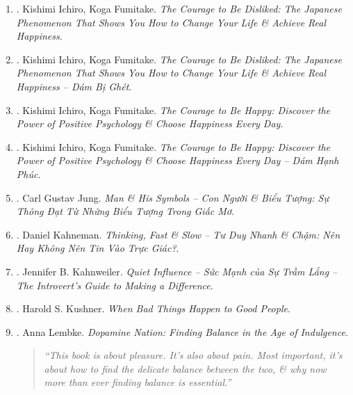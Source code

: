 \documentclass{article}
\begin{document}
\begin{enumerate}
	[Endorsement] ``Dr. {\sc Faith Harper} has done it again. Using the foulest of language, Faith has written a book that explains anger, gives you tools to turn down the volume on anger \& presents it in a way where you can actually read the whole fucking book (because it isn't boring, constipated\footnote{unable to get rid of waste material from the bowels easily, bị táo bón.} \& dry like most academic tomes). If you think you might be irritable, or if your wife says you are irritable, do yourself a big ass favor, buy this book, read it, put the tools in it into practice. You can thank me later -- when you are happier, more connected \& less fucking irritable!'' -- Dr. {\sc John Schinnerer}, creator of the Ultimate Anger Management Course, host of {\it The Evolved Caveman Podcast}, \& High Performance Coach at Guide to Self
	\item \cite{Ichiro_Fumitake_disliked}. {\sc Kishimi Ichiro, Koga Fumitake}. {\it The Courage to Be Disliked: The Japanese Phenomenon That Shows You How to Change Your Life \& Achieve Real Happiness}.
	\item \cite{Ichiro_Fumitake_disliked_VN}. {\sc Kishimi Ichiro, Koga Fumitake}. {\it The Courage to Be Disliked: The Japanese Phenomenon That Shows You How to Change Your Life \& Achieve Real Happiness -- Dám Bị Ghét}.\hfill{\sf[done]}
	\item \cite{Ichiro_Fumitake_happy}. {\sc Kishimi Ichiro, Koga Fumitake}. {\it The Courage to Be Happy: Discover the Power of Positive Psychology \& Choose Happiness Every Day}.
	\item \cite{Ichiro_Fumitake_happy_VN}. Kishimi Ichiro, Koga Fumitake. {\it The Courage to Be Happy: Discover the Power of Positive Psychology \& Choose Happiness Every Day -- Dám Hạnh Phúc}.\hfill{\sf[done]}
	\item \cite{Jung2022}. Carl Gustav Jung. {\it Man \& His Symbols -- Con Người \& Biểu Tượng: Sự Thông Đạt Từ Những Biểu Tượng Trong Giấc Mơ}.\hfill{\sf[done]}
	\item \cite{Kahneman2022}. Daniel Kahneman. {\it Thinking, Fast \& Slow -- Tư Duy Nhanh \& Chậm: Nên Hay Không Nên Tin Vào Trực Giác?}.\\\mbox{}\hfill{\sf[done]}
	\item \cite{Kahnweiler2022}. Jennifer B. Kahnweiler. {\it Quiet Influence -- Sức Mạnh của Sự Trầm Lắng -- The Introvert's Guide to Making a Difference}.\hfill{\sf[done]}
	\item \cite{Kushner_bad_things_good_people}. {\sc Harold S. Kushner}. {\it When Bad Things Happen to Good People}.
	\item \cite{Lembke_dopamine}. {\sc Anna Lembke}. {\it Dopamine Nation: Finding Balance in the Age of Indulgence}.\hfill{\sf[reading]}
	\begin{quotation}
		{\it``This book is about pleasure. It's also about pain. Most important, it's about how to find the delicate balance between the two, \& why now more than ever finding balance is essential.''}
		

\end{quotation}
\end{enumerate}
\end{document}
